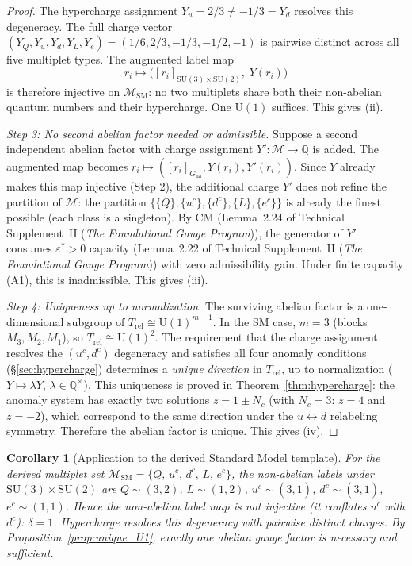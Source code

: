\documentclass[11pt]{article}
\newtheorem{corollary}[theorem]{Corollary}
\theoremstyle{definition}
\newcommand{\SU}{\mathrm{SU}}
\newcommand{\U}{\mathrm{U}}
\newcommand{\TSII}{Technical Supplement~II (\emph{The Foundational Gauge Program})}
\begin{document}
\begin{proof}
The hypercharge assignment $Y_u = 2/3 \ne -1/3 = Y_d$
resolves this degeneracy.  The full charge vector
$(Y_Q, Y_u, Y_d, Y_L, Y_e) = (1/6, 2/3, -1/3, -1/2, -1)$
is pairwise distinct across all five multiplet types.  The augmented
label map
\[
  r_i \mapsto \bigl([r_i]_{\SU(3) \times \SU(2)},\; Y(r_i)\bigr)
\]
is therefore injective on $\mathcal{M}_{\mathrm{SM}}$: no two
multiplets share both their non-abelian quantum numbers and their
hypercharge.  One $\U(1)$ suffices.  This gives (ii).

\textit{Step 3: No second abelian factor needed or admissible.}\quad
Suppose a second independent abelian factor with charge assignment
$Y': \mathcal{M} \to \mathbb{Q}$ is added.  The augmented map
becomes $r_i \mapsto ([r_i]_{G_{\mathrm{na}}}, Y(r_i), Y'(r_i))$.
Since $Y$ already makes this map injective (Step 2), the additional
charge $Y'$ does not refine the partition of $\mathcal{M}$: the
partition $\{\{Q\}, \{u^c\}, \{d^c\}, \{L\}, \{e^c\}\}$ is already
the finest possible (each class is a singleton).  By CM
(Lemma~2.24 of \TSII{}), the generator of $Y'$ consumes
$\varepsilon^* > 0$ capacity (Lemma~2.22 of \TSII{}) with zero
admissibility gain.  Under finite capacity (A1), this is inadmissible.
This gives (iii).

\textit{Step 4: Uniqueness up to normalization.}\quad
The surviving abelian factor is a one-dimensional subgroup of
$T_{\mathrm{rel}} \cong \mathrm{U}(1)^{m-1}$.  In the SM case,
$m = 3$ (blocks $M_3, M_2, M_1$), so $T_{\mathrm{rel}} \cong
\mathrm{U}(1)^2$.  The requirement that the charge assignment
resolves the $(u^c, d^c)$ degeneracy and satisfies all four anomaly
conditions (\S\ref{sec:hypercharge}) determines a \emph{unique
direction} in $T_{\mathrm{rel}}$, up to normalization
($Y \mapsto \lambda Y$, $\lambda \in \mathbb{Q}^\times$).  This
uniqueness is proved in Theorem~\ref{thm:hypercharge}: the anomaly
system has exactly two solutions $z = 1 \pm N_c$ (with $N_c = 3$:
$z = 4$ and $z = -2$), which correspond to the same direction
under the $u \leftrightarrow d$ relabeling symmetry.  Therefore
the abelian factor is unique.  This gives (iv).
\end{proof}

\begin{corollary}[Application to the derived Standard Model template]
\label{cor:unique_U1_SM}
For the derived multiplet set
$\mathcal{M}_{\mathrm{SM}} = \{Q,\, u^c,\, d^c,\, L,\, e^c\}$,
the non-abelian labels under $\SU(3) \times \SU(2)$ are
$Q \sim (3,2)$, $L \sim (1,2)$, $u^c \sim (\bar{3},1)$,
$d^c \sim (\bar{3},1)$, $e^c \sim (1,1)$.
Hence the non-abelian label map is not injective (it conflates $u^c$
with $d^c$): $\delta = 1$.  Hypercharge resolves this degeneracy with
pairwise distinct charges.  By Proposition~\ref{prop:unique_U1},
exactly one abelian gauge factor is necessary and sufficient.
\end{corollary}
\end{document}
